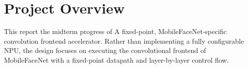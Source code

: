 \section{Project Overview}
 
This report the midterm progress of A fixed-point, MobileFaceNet-specific convolution frontend accelerator. Rather than implementing a fully configurable NPU, the design focuses on executing the convolutional frontend of MobileFaceNet with a fixed-point datapath and layer-by-layer control flow.
 
 